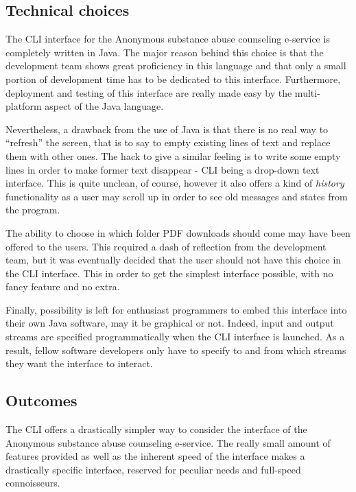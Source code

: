 \documentclass[a4paper,12pt, twocolumn]{article}
\begin{document}
\subsection*{Technical choices}

The CLI interface for the Anonymous substance abuse counseling e-service is completely written in Java. The major reason behind this choice is that the development team shows great proficiency in this language and that only a small portion of development time has to be dedicated to this interface. Furthermore, deployment and testing of this interface are really made easy by the multi-platform aspect of the Java language.

Nevertheless, a drawback from the use of Java is that there is no real way to ``refresh'' the screen, that is to say to empty existing lines of text and replace them with other ones. The hack to give a similar feeling is to write some empty lines in order to make former text disappear - CLI being a drop-down text interface. This is quite unclean, of course, however it also offers a kind of \emph{history} functionality as a user may scroll up in order to see old messages and states from the program.

The ability to choose in which folder PDF downloads should come may have been offered to the users. This required a dash of reflection from the development team, but it was eventually decided that the user should not have this choice in the CLI interface. This in order to get the simplest interface possible, with no fancy feature and no extra.

Finally, possibility is left for enthusiast programmers to embed this interface into their own Java software, may it be graphical or not. Indeed, input and output streams are specified programmatically when the CLI interface is launched. As a result, fellow software developers only have to specify to and from which streams they want the interface to interact.

\subsection*{Outcomes}

The CLI offers a drastically simpler way to consider the interface of the Anonymous substance abuse counseling e-service. The really small amount of features provided as well as the inherent speed of the interface makes a drastically specific interface, reserved for peculiar needs and full-speed connoisseurs.\\
\end{document}
